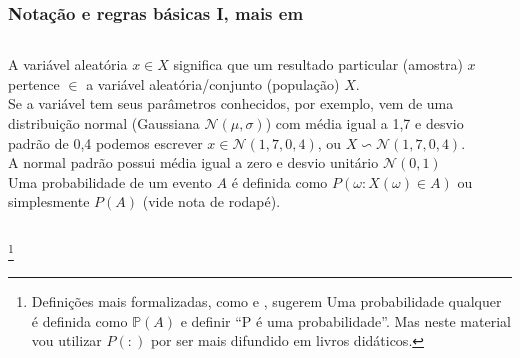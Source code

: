 \documentclass[graphics,14pt]{beamer}
\newcommand{\lfr}[1]{\let\thefootnote\relax\footnote{\hspace{0.6cm}\vspace{1.25cm} #1}}
\begin{document}
\begin{frame}[t,fragile=singleslide]
\frametitle{Notação e regras básicas I, mais em \citep{Halperin1965}}
	\begin{columns}[T] %
	\begin{column}{.85\textwidth}
		A variável aleatória $x \in X$ significa que um resultado particular (amostra) $x$ pertence $\in$ a variável aleatória/conjunto (população) $X$.\\
		\vspace{0.5cm}
		Se a variável tem seus parâmetros conhecidos, por exemplo, vem de uma distribuição normal (Gaussiana $\mathcal{N}(\mu,\sigma)$) com média igual a 1,7 e desvio padrão de 0,4 podemos escrever $x \in \mathcal{N}(1,7,0,4)$, ou $X \backsim \mathcal{N}(1,7,0,4)$. \\
		\vspace{0.5cm}
		A normal padrão possui média igual a zero e desvio unitário $\mathcal{N}(0,1)$\\		
		\vspace{0.5cm}
		Uma probabilidade de um evento $A$ é definida como $P(\omega:X(\omega) \in A)$ ou simplesmente $P(A)$ (vide nota de rodapé).
		
	\end{column}
	\hfill
	\begin{column}{0.05\textwidth}
	\end{column}		
	\end{columns}
	\vfill
	\lfr{Definições mais formalizadas, como \cite{Halperin1965} e \cite{Wikipedia2017}, sugerem Uma probabilidade qualquer é definida como $\mathbb{P}(A)$ e definir ``P é uma probabilidade''. Mas neste material vou utilizar $P(:)$ por ser mais difundido em livros didáticos.}
	
\end{frame}
\end{document}

